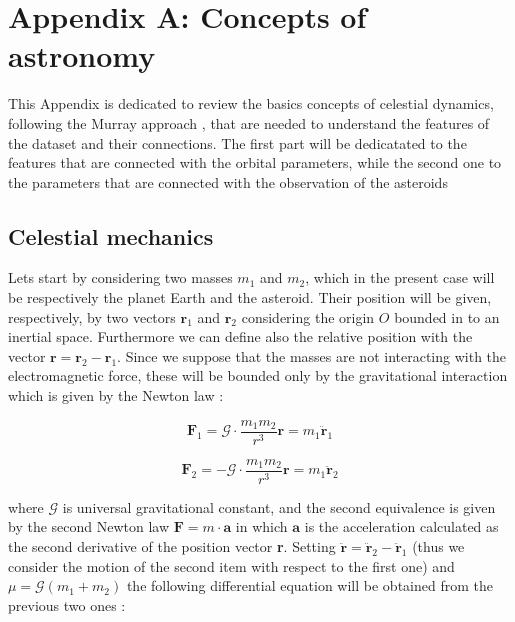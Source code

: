 \documentclass[12pt,%
               a4paper,%
               oneside,openany,%
               titlepage,%
               headinclude,footinclude,%
               BCOR5mm,%
               cleardoublepage=empty,%
               tablecaptionabove,%
               floatperchapter,
               ]{scrreprt}                 %
\begin{document}
\chapter{Appendix A: Concepts of astronomy}

This Appendix is dedicated to review the basics concepts of celestial dynamics, following the Murray approach \cite{murray1999solar}, that are needed to understand the features of the dataset and their connections. The first part will be dedicatated to the features that are connected with the orbital parameters, while the second one to the parameters that are connected with the observation of the asteroids

\section{Celestial mechanics}

Lets start by considering two masses $m_{1}$ and $m_{2}$, which in the present case will be respectively the planet Earth and the asteroid. Their position will be given, respectively, by two vectors $\textbf{r}_{1}$ and $\textbf{r}_{2}$ considering the origin $O$ bounded in to an inertial space. Furthermore we can define also the relative position with the vector $\textbf{r}=\textbf{r}_{2}-\textbf{r}_{1}$. Since we suppose that the masses are not interacting with the electromagnetic force, these will be bounded only by the gravitational interaction which is given by the Newton law \cite{murray1999solar}:


\begin{equation}
\textbf{F}_{1}=\mathcal{G} \cdot \frac{m_{1}m_{2}}{r^{3}}\textbf{r}=m_{1} \ddot{\textbf{r}}_{1}
\end{equation}

\begin{equation}
\textbf{F}_{2}=-\mathcal{G} \cdot \frac{m_{1}m_{2}}{r^{3}}\textbf{r}=m_{1} \ddot{\textbf{r}}_{2}
\end{equation}

where $\mathcal{G}$ is universal gravitational constant, and the second equivalence is given by the second Newton law $\textbf{F}=m\cdot \textbf{a}$ in which $\textbf{a}$ is the acceleration calculated as the second derivative of the position vector \textbf{r}. Setting $\ddot{\textbf{r}}=\ddot{\textbf{r}}_{2}-\ddot{\textbf{r}}_{1}$ (thus we consider the motion of the second item with respect to the first one) and $\mu=\mathcal{G}(m_{1}+m_{2})$ the following differential equation will be obtained from the previous two ones \cite{murray1999solar}:
\end{document}
